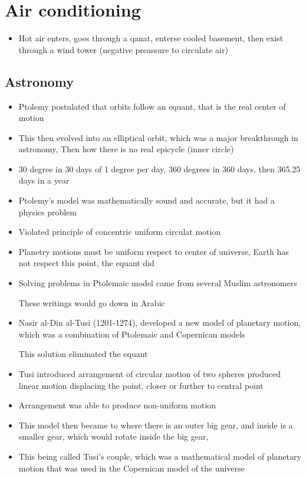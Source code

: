 \documentclass{article}
\begin{document}
\section*{Air conditioning}
\begin{itemize}
  \item Hot air enters, goes through a qanat, enterse cooled basement,
    then exist through a wind tower (negative preassure to circulate air)
\end{itemize}

\subsection{Astronomy}
\begin{itemize}
  \item Ptolemy postulated that orbits follow an equant, that is the real center of motion
  \item This then evolved into an elliptical orbit, which was
    a major breakthrough in astronomy,
    Then how there is no real epicycle (inner circle)
  \item 30 degree in 30 days of 1 degree per day,
    360 degrees in 360 days, then 365.25 days in a year
  \item Ptolemy's model was mathematically sound and accurate, but it
    had a physics problem
  \item Violated principle of concentric uniform circulat motion
  \item Planetry motions must be uniform respect to center of universe, Earth
    has not respect this point, the equant did
  \item Solving problems in Ptolemaic model came from several Muslim astronomers

    These writings would go down in Arabic
  \item Nasir al-Din al-Tusi (1201-1274),
    developed a new model of planetary motion, which was
    a combination of Ptolemaic and Copernican models

    This solution eliminated the equant
  \item Tusi introduced arrangement of circular motion of two spheres
    produced linear motion displacing the point,
    closer or further to central point
  \item Arrangement was able to produce non-uniform motion
  \item This model then became to where there is an outer big gear, and inside
    is a smaller gear, which would rotate inside the big gear,
  \item This being called Tusi's couple, which was a
    mathematical model of planetary motion that was used in
    the Copernican model of the universe


\end{itemize}
\end{document}
